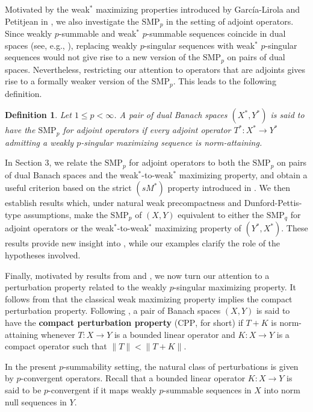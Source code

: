 \documentclass[12 pt]{article}%
\newtheorem{final remark}[theorem]{Final Remark}
\newtheorem{definition}[theorem]{Definition}
\begin{document}
Motivated by the weak$^\ast$ maximizing properties introduced by García-Lirola and Petitjean in \cite{garcia-lirola}, we also investigate the $\mathrm{SMP}_p$ in the setting of adjoint operators. Since weakly $p$-summable and weak$^\ast$ $p$-summable sequences coincide in dual spaces (see, e.g., \cite[p. 2]{fourie}), replacing weakly $p$-singular sequences with weak$^\ast$ $p$-singular sequences would not give rise to a new version of the $\mathrm{SMP}_p$ on pairs of dual spaces. Nevertheless, restricting our attention to operators that are adjoints
gives rise to a formally weaker version of the $\mathrm{SMP}_p$. This leads to the following definition.


\begin{definition}  \label{defsmppadj}
Let $1\leq p<\infty$. A pair of dual Banach spaces $(X^\ast,Y^\ast)$ is said to have the $\mathrm{SMP}_p$ for adjoint operators if every adjoint operator $T^*: X^* \to Y^*$ admitting a weakly $p$-singular maximizing sequence is norm-attaining.
\end{definition}

In Section 3, we relate the $\mathrm{SMP}_p$ for adjoint operators to both the $\mathrm{SMP}_p$ on pairs of dual Banach spaces and the  weak$^*$-to-weak$^*$ maximizing property, and obtain a useful criterion based on the strict $(sM^\ast)$ property introduced in \cite{han}. 
We then establish results which, under natural weak precompactness and Dunford-Pettis-type assumptions, make the $\mathrm{SMP}_p$ of $(X,Y)$ equivalent to either the $\mathrm{SMP}_q$ for adjoint operators or the weak$^\ast$-to-weak$^\ast$ maximizing property of $(Y^\ast,X^\ast)$. These results provide new insight into \cite[Question 5.12]{garcia-lirola}, while our examples clarify the role of the hypotheses involved.


Finally, motivated by results from \cite{arongarciapelteix} and \cite{jung}, we now turn our attention to a perturbation property related to the weakly $p$-singular maximizing property. It follows from \cite{arongarciapelteix} that the classical weak maximizing property implies the compact perturbation property. Following \cite{jung}, a pair of Banach spaces $(X,Y)$ is said to have the \textbf{compact perturbation property} ($\mathrm{CPP}$, for short) if $T+K$ is norm-attaining whenever $T:X\to Y$ is a bounded linear operator and $K:X\to Y$ is a compact operator such that
$\|T\|<\|T+K\|.$

In the present $p$-summability setting, the natural class of perturbations is given by $p$-convergent operators. Recall that a bounded linear operator $K:X\to Y$ is said to be $p$-convergent if it maps weakly $p$-summable sequences in $X$ into norm null sequences in $Y$.
\end{document}
